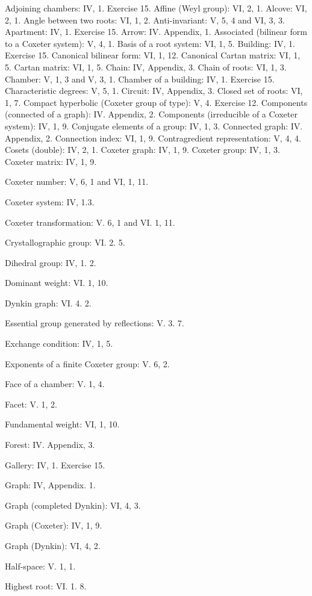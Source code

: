 Adjoining chambers: IV, 1. Exercise 15. Affine (Weyl group): VI, 2, 1. Alcove: VI, 2, 1. Angle between two roots: VI, 1, 2. Anti-invariant: V, 5, 4 and VI, 3, 3. Apartment: IV, 1. Exercise 15. Arrow: IV. Appendix, 1. Associated (bilinear form to a Coxeter system): V, 4, 1. Basis of a root system: VI, 1, 5. Building: IV, 1. Exercise 15. Canonical bilinear form: VI, 1, 12. Canonical Cartan matrix: VI, 1, 5. Cartan matrix: VI, 1, 5. Chain: IV, Appendix, 3. Chain of roots: VI, 1, 3. Chamber: V, 1, 3 and V, 3, 1. Chamber of a building: IV, 1. Exercise 15. Characteristic degrees: V, 5, 1. Circuit: IV, Appendix, 3. Closed set of roots: VI, 1, 7. Compact hyperbolic (Coxeter group of type): V, 4. Exercise 12. Components (connected of a graph): IV. Appendix, 2. Components (irreducible of a Coxeter system): IV, 1, 9. Conjugate elements of a group: IV, 1, 3. Connected graph: IV. Appendix, 2. Connection index: VI, 1, 9. Contragredient representation: V, 4, 4. Cosets (double): IV, 2, 1. Coxeter graph: IV, 1, 9. Coxeter group: IV, 1, 3. Coxeter matrix: IV, 1, 9.

Coxeter number: V, 6, 1 and VI, 1, 11.

Coxeter system: IV, 1.3.

Coxeter transformation: V. 6, 1 and VI. 1, 11.

Crystallographic group: VI. 2. 5.

Dihedral group: IV, 1. 2.

Dominant weight: VI. 1, 10.

Dynkin graph: VI. 4. 2.

Essential group generated by reflections: V. 3. 7.

Exchange condition: IV, 1, 5.

Exponents of a finite Coxeter group: V. 6, 2.

Face of a chamber: V. 1, 4.

Facet: V. 1, 2.

Fundamental weight: VI, 1, 10.

Forest: IV. Appendix, 3.

Gallery: IV, 1. Exercise 15.

Graph: IV, Appendix. 1.

Graph (completed Dynkin): VI, 4, 3.

Graph (Coxeter): IV, 1, 9.

Graph (Dynkin): VI, 4, 2.

Half-space: V. 1, 1.

Highest root: VI. 1. 8.

